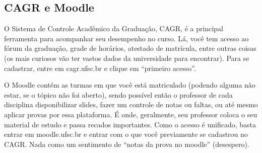 \subsection{CAGR e Moodle}

O Sistema de Controle Acadêmico da Graduação, CAGR, é a principal ferramenta para acompanhar seu desempenho no curso. Lá, você tem acesso ao fórum da graduação, grade de horários, atestado de matrícula, entre outras coisas (os mais curiosos vão ter vastos dados da universidade para encontrar). Para se cadastrar, entre em cagr.ufsc.br e clique em “primeiro acesso”.

O Moodle contém as turmas em que você está matriculado (podendo alguma não estar, se o tópico não foi aberto), sendo possível então o professor de cada disciplina disponibilizar slides, fazer um controle de notas ou faltas, ou até mesmo aplicar provas por essa plataforma. É onde, geralmente, seu professor coloca o seu material de estudo e passa recados importantes. Como o acesso é unificado, basta entrar em moodle.ufsc.br e entrar com o que você previamente se cadastrou no CAGR. Nada como um sentimento de “notas da prova no moodle” (desespero).
